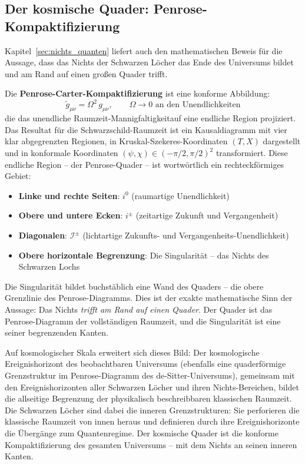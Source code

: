 ﻿\documentclass[12pt,a4paper]{report}
\begin{document}
\subsection{Der kosmische Quader: Penrose-Kompaktifizierung}

Kapitel~\ref{sec:nichts_quanten} liefert auch den mathematischen Beweis für die Aussage, dass das Nichts der Schwarzen Löcher das Ende des Universums bildet und am Rand auf einen großen Quader trifft.

Die \textbf{Penrose-Carter-Kompaktifizierung} \cite{penrose2004,misner1973} ist eine konforme Abbildung:
\begin{equation*}
    \tilde{g}_{\mu\nu} = \Omega^2\, g_{\mu\nu}, \qquad \Omega \to 0 \text{ an den Unendlichkeiten}
\end{equation*}
die das unendliche Raumzeit-Mannigfaltigkeitauf eine endliche Region projiziert. Das Resultat für die Schwarzschild-Raumzeit ist ein Kausaldiagramm mit vier klar abgegrenzten Regionen, in Kruskal-Szekeres-Koordinaten $(T, X)$ dargestellt und in konformale Koordinaten $(\psi, \chi) \in (-\pi/2, \pi/2)^2$ transformiert. Diese endliche Region -- der Penrose-Quader -- ist wortwörtlich ein rechteckförmiges Gebiet:

\begin{itemize}
    \item \textbf{Linke und rechte Seiten}: $i^0$ (raumartige Unendlichkeit)
    \item \textbf{Obere und untere Ecken}: $i^\pm$ (zeitartige Zukunft und Vergangenheit)
    \item \textbf{Diagonalen}: $\mathscr{I}^\pm$ (lichtartige Zukunfts- und Vergangenheits-Unendlichkeit)
    \item \textbf{Obere horizontale Begrenzung}: Die Singularität -- das Nichts des Schwarzen Lochs
\end{itemize}

Die Singularität bildet buchstäblich eine Wand des Quaders -- die obere Grenzlinie des Penrose-Diagramms. Dies ist der exakte mathematische Sinn der Aussage: Das Nichts \emph{trifft am Rand auf einen Quader}. Der Quader ist das Penrose-Diagramm der vollständigen Raumzeit, und die Singularität ist eine seiner begrenzenden Kanten.

Auf kosmologischer Skala erweitert sich dieses Bild: Der kosmologische Ereignishorizont des beobachtbaren Universums (ebenfalls eine quaderförmige Grenzstruktur im Penrose-Diagramm des de-Sitter-Universums), gemeinsam mit den Ereignishorizonten aller Schwarzen Löcher und ihren Nichts-Bereichen, bildet die allseitige Begrenzung der physikalisch beschreibbaren klassischen Raumzeit. Die Schwarzen Löcher sind dabei die inneren Grenzstrukturen: Sie perforieren die klassische Raumzeit von innen heraus und definieren durch ihre Ereignishorizonte die Übergänge zum Quantenregime. Der kosmische Quader ist die konforme Kompaktifizierung des gesamten Universums -- mit dem Nichts an seinen inneren Kanten.
\end{document}

